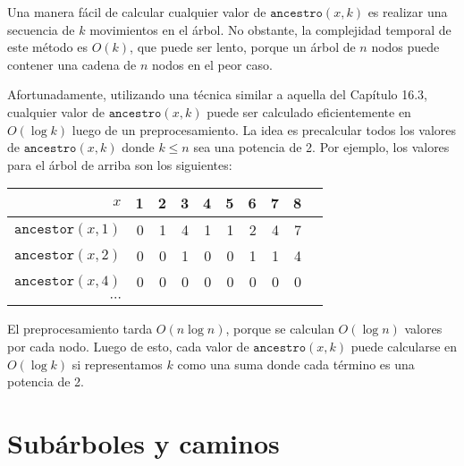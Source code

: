 Una manera fácil de calcular cualquier valor de $\texttt{ancestro}(x,k)$
es realizar una secuencia de $k$ movimientos en el árbol. No obstante,
la complejidad temporal de este método es $O(k)$, que puede ser lento,
porque un árbol de $n$ nodos puede contener una cadena de $n$ nodos
en el peor caso.

Afortunadamente, utilizando una técnica similar a aquella del Capítulo
16.3, cualquier valor de $\texttt{ancestro}(x,k)$ puede ser calculado
eficientemente en $O(\log k)$ luego de un preprocesamiento.
La idea es precalcular todos los valores de $\texttt{ancestro}(x,k)$
donde $k \le n$ sea una potencia de 2. Por ejemplo, los valores para
el árbol de arriba son los siguientes:

\begin{center}
    \begin{tabular}{r|rrrrrrrrr}
        $x$                      & 1 & 2 & 3 & 4 & 5 & 6 & 7 & 8 \\
        \hline
        $\texttt{ancestor}(x,1)$ & 0 & 1 & 4 & 1 & 1 & 2 & 4 & 7 \\
        $\texttt{ancestor}(x,2)$ & 0 & 0 & 1 & 0 & 0 & 1 & 1 & 4 \\
        $\texttt{ancestor}(x,4)$ & 0 & 0 & 0 & 0 & 0 & 0 & 0 & 0 \\
        $\cdots$                                                 \\
    \end{tabular}
\end{center}

El preprocesamiento tarda $O(n \log n)$, porque se calculan $O(\log n)$
valores por cada nodo. Luego de esto, cada valor de
$\texttt{ancestro}(x,k)$ puede calcularse en $O(\log k)$ si
representamos $k$ como una suma donde cada término es una potencia de 2.

\section{Subárboles y caminos}


